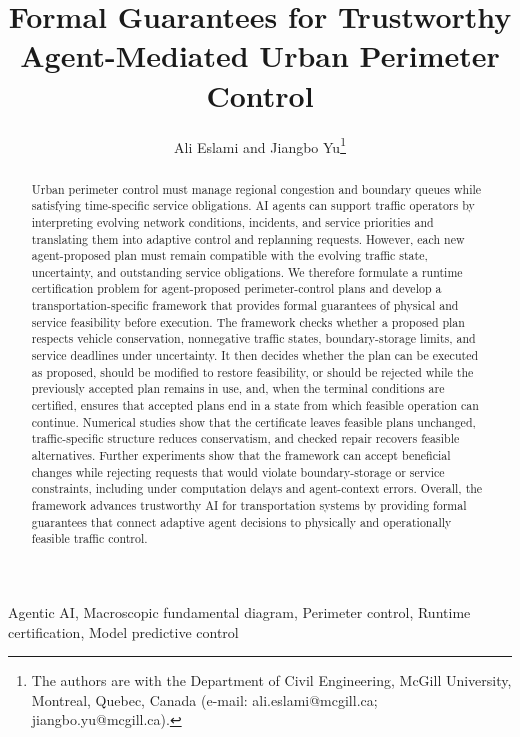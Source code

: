 \documentclass[journal,10pt]{IEEEtran}
\begin{document}
\title{Formal Guarantees for Trustworthy Agent-Mediated Urban Perimeter Control}
\author{Ali Eslami and Jiangbo Yu\thanks{The authors are with the Department of Civil Engineering,
McGill University, Montreal, Quebec, Canada (e-mail: ali.eslami@mcgill.ca;
jiangbo.yu@mcgill.ca).}}
\maketitle
\begin{abstract}
Urban perimeter control must manage regional congestion and boundary queues
while satisfying time-specific service obligations. AI agents can support
traffic operators by interpreting evolving network conditions, incidents,
and service priorities and translating them into adaptive control and
replanning requests. However, each new agent-proposed plan must remain
compatible with the evolving traffic state, uncertainty, and outstanding
service obligations. We therefore formulate a runtime certification problem
for agent-proposed perimeter-control plans and develop a
transportation-specific framework that provides formal guarantees of
physical and service feasibility before execution. The framework checks
whether a proposed plan respects vehicle conservation, nonnegative traffic
states, boundary-storage limits, and service deadlines under uncertainty. It
then decides whether the plan can be executed as proposed, should be
modified to restore feasibility, or should be rejected while the previously
accepted plan remains in use, and, when the terminal conditions are
certified, ensures that accepted plans end in a state from which feasible
operation can continue. Numerical studies show that the certificate leaves
feasible plans unchanged, traffic-specific structure reduces conservatism,
and checked repair recovers feasible alternatives. Further experiments show
that the framework can accept beneficial changes while rejecting requests
that would violate boundary-storage or service constraints, including under
computation delays and agent-context errors. Overall, the framework advances
trustworthy AI for transportation systems by providing formal guarantees
that connect adaptive agent decisions to physically and operationally
feasible traffic control.
\end{abstract}
\begin{IEEEkeywords}Agentic AI, Macroscopic fundamental diagram, Perimeter control, Runtime certification, Model predictive control\end{IEEEkeywords}
\end{document}
